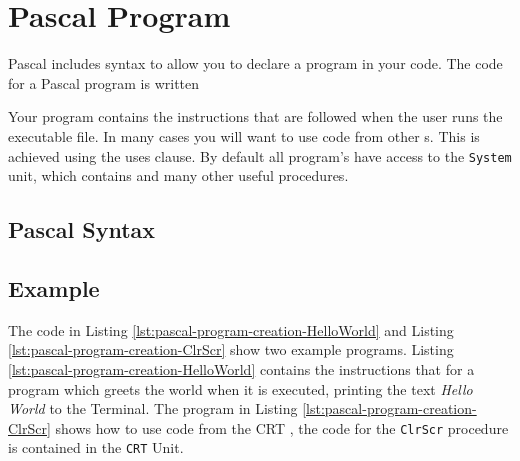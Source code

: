 \clearpage
\section{Pascal Program} %
\label{sec:pascal-basic-program}

Pascal includes syntax to allow you to declare a program in your code. The code for a Pascal program is written

Your program contains the instructions that are followed when the user runs the executable file. In many cases you will want to use code from other s. This is achieved using the uses clause. By default all program's have access to the \texttt{System} unit, which contains  and many other useful procedures.

\subsection*{Pascal Syntax} %
\label{sub:programsgeneralform}



\subsection*{Example} %
\label{sub:programExamples}

The code in Listing \ref{lst:pascal-program-creation-HelloWorld} and Listing \ref{lst:pascal-program-creation-ClrScr} show two example programs. Listing \ref{lst:pascal-program-creation-HelloWorld} contains the instructions that for a program which greets the world when it is executed, printing the text \emph{Hello World} to the Terminal. The program in Listing \ref{lst:pascal-program-creation-ClrScr} shows how to use code from the CRT , the code for the \texttt{ClrScr} procedure is contained in the \texttt{CRT} Unit.





